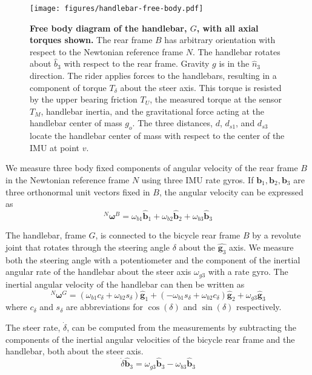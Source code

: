 \documentclass[10pt]{article}
\begin{document}
\begin{figure}
  \centering
  \texttt{[image: figures/handlebar-free-body.pdf]}
  \caption{{\bf Free body diagram of the handlebar, $G$, with all axial torques
    shown.} The rear frame $B$ has arbitrary orientation with respect to the
    Newtonian reference frame $N$. The handlebar rotates about $\hat{b}_3$ with
    respect to the rear frame. Gravity $g$ is in the $\hat{n}_3$ direction. The
    rider applies forces to the handlebars, resulting in a component of torque
    $T_\delta$ about the steer axis. This torque is resisted by the upper
    bearing friction $T_U$, the measured torque at the sensor $T_M$, 
    handlebar inertia, and the gravitational force acting at the
    handlebar center of mass $g_o$. The three distances, $d$, $d_{s1}$, and
    $d_{s3}$ locate the handlebar center of mass with respect to the center of
    the IMU at point $v$.}
  \label{fig:handlebar-free-body}
\end{figure}

We measure three body fixed components of angular velocity of the rear
frame $B$ in the Newtonian reference frame $N$ using three IMU rate gyros.
If $\mathbf{b}_{1},\mathbf{b}_{2},\mathbf{b}_{3}$ are three orthonormal unit
vectors fixed in $B$, the angular velocity can be expressed as
%
\begin{equation}
  ^N\boldsymbol{\omega}^B = \omega_{b1}\hat{\mathbf{b}}_1 +
                            \omega_{b2}\hat{\mathbf{b}}_2 +
                            \omega_{b3}\hat{\mathbf{b}}_3
  \label{eq:rear-frame-angular-rate}
\end{equation}

The handlebar, frame $G$, is connected to the bicycle rear frame $B$ by a
revolute joint that rotates through the steering angle $\delta$ about the
$\hat{\mathbf{g}_3}$ axis. We measure both the steering angle with a
potentiometer and the component of the inertial angular rate of the
handlebar about the steer axis $\omega_{g3}$ with a rate gyro. The inertial angular
velocity of the handlebar can then be written as
%
\begin{equation}
  ^N\boldsymbol{\omega}^G =
    (\omega_{b1}c_\delta + \omega_{b2}s_\delta)\hat{\mathbf{g}}_1 +
    (-\omega_{b1}s_\delta + \omega_{b2}c_\delta)\hat{\mathbf{g}}_2 +
    \omega_{g3}\hat{\mathbf{g}}_3
\end{equation}
%
where $c_\delta$ and $s_\delta$ are abbreviations for $\operatorname{cos}(\delta)$
and $\operatorname{sin}(\delta)$ respectively.

The steer rate, $\dot{\delta}$, can be computed from the measurements by
subtracting the components of the inertial angular velocities of the bicycle rear frame 
and the handlebar, both about the steer axis.
%
\begin{equation}
  \dot{\delta} \hat{\mathbf{b}}_3 = \omega_{g3} \hat{\mathbf{b}}_3 - \omega_{b3} \hat{\mathbf{b}}_3
\end{equation}
\end{document}
